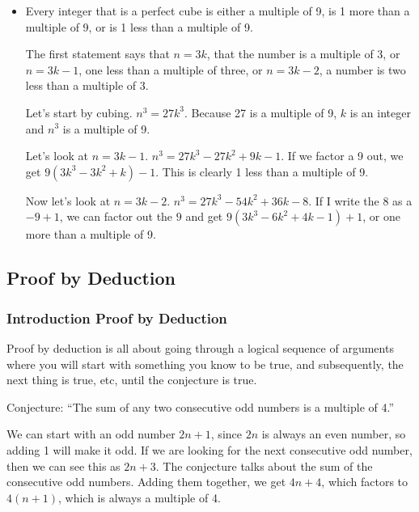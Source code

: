 \documentclass[../maths.tex]{subfiles}
\begin{document}
\begin{itemize}
    \item Every integer that is a perfect cube is either a multiple of 9, is 1 more than a multiple of 9, or is 1 less than a multiple of 9.
    
    The first statement says that $n=3k$, that the number is a multiple of 3, or $n=3k-1$, one less than a multiple of three, or $n=3k-2$, a number is two less than a multiple of 3.

    Let's start by cubing. $n^3=27k^3$. Because 27 is a multiple of 9, $k$ is an integer and $n^3$ is a multiple of 9. 

    Let's look at $n=3k-1$. $n^3=27k^3-27k^2+9k-1$. If we factor a 9 out, we get $9(3k^3-3k^2+k)-1$. This is clearly 1 less than a multiple of 9.

    Now let's look at $n=3k-2$. $n^3=27k^3-54k^2+36k-8$. If I write the 8 as a $-9+1$, we can factor out the $9$ and get $9(3k^3-6k^2+4k-1)+1$, or one more than a multiple of 9.
\end{itemize}
\subsection*{Proof by Deduction}
\subsubsection*{Introduction Proof by Deduction}
Proof by deduction is all about going through a logical sequence of arguments where you will start with something you know to be true, and subsequently, the next thing is true, etc, until the conjecture is true.

Conjecture: ``The sum of any two consecutive odd numbers is a multiple of 4.''

We can start with an odd number $2n+1$, since $2n$ is always an even number, so adding 1 will make it odd. If we are looking for the next consecutive odd number, then we can see this as $2n+3$.
The conjecture talks about the sum of the consecutive odd numbers. Adding them together, we get $4n+4$, which factors to $4(n+1)$, which is always a multiple of 4.
\end{document}
